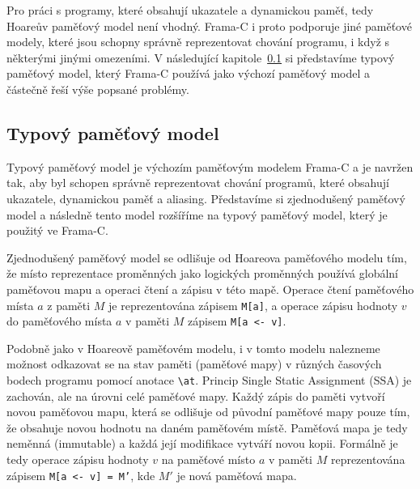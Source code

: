 Pro práci s programy, které obsahují ukazatele a dynamickou paměť, tedy Hoareův paměťový model není vhodný.
Frama\mbox{-}C i proto podporuje jiné paměťové modely,
které jsou schopny správně reprezentovat chování programu, i když s některými jinými omezeními.
V následující kapitole~\ref{subsec:typovy-pametovy-model} si představíme typový paměťový model,
který Frama\mbox{-}C používá jako výchozí paměťový model a částečně řeší výše popsané problémy.

\subsection{Typový paměťový model}
\label{subsec:typovy-pametovy-model}


Typový paměťový model je výchozím paměťovým modelem Frama\mbox{-}C
a je navržen tak, aby byl schopen správně reprezentovat chování programů,
které obsahují ukazatele, dynamickou paměť a aliasing.
Představíme si zjednodušený paměťový model a následně tento model rozšíříme na typový paměťový model,
který je použitý ve Frama\mbox{-}C\@.


Zjednodušený paměťový model se odlišuje od Hoareova paměťového modelu tím,
že místo reprezentace proměnných jako logických proměnných
používá globální paměťovou mapu a operaci čtení a zápisu v této mapě.
Operace čtení paměťového místa $a$ z paměti $M$ je reprezentována zápisem \texttt{M[a]},
a operace zápisu hodnoty $v$ do paměťového místa $a$ v paměti $M$ zápisem \texttt{M[a <- v]}.


Podobně jako v Hoareově paměťovém modelu,
i v tomto modelu nalezneme možnost odkazovat se na stav paměti (paměťové mapy)
v různých časových bodech programu pomocí anotace \texttt{\textbackslash at}.
Princip Single Static Assignment (SSA) je zachován, ale na úrovni celé paměťové mapy.
Každý zápis do paměti vytvoří novou paměťovou mapu,
která se odlišuje od původní paměťové mapy pouze tím,
že obsahuje novou hodnotu na daném paměťovém místě.
Paměťová mapa je tedy neměnná (immutable) a každá její modifikace vytváří novou kopii.
Formálně je tedy operace zápisu hodnoty $v$ na paměťové místo $a$ v paměti $M$ reprezentována zápisem
\texttt{M[a <- v] = M'}, kde $M'$ je nová paměťová mapa.

